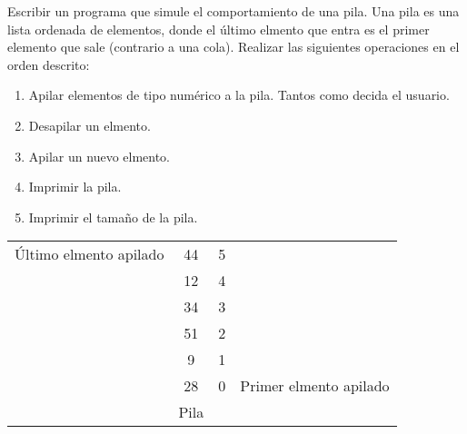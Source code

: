 
\question  Escribir un programa que simule el comportamiento de una pila.
           Una pila es una lista ordenada de elementos, donde el último
           elmento que entra es el primer elemento que sale (contrario a una
           cola). Realizar las siguientes operaciones en el orden descrito:

\begin{enumerate}
  \item Apilar elementos de tipo numérico a la pila. Tantos como decida el
        usuario.
  \item Desapilar un elmento.
  \item Apilar un nuevo elmento.
  \item Imprimir la pila.
  \item Imprimir el tamaño de la pila.
\end{enumerate}

\begin{center}
  \begin{tabular}{l|c|cr}
    Último elmento apilado  & 44 & 5 & \\
       & 12 & 4 & \\
       & 34 & 3 & \\
       & 51 & 2 & \\
       &  9 & 1 & \\
       & 28 & 0 & Primer elmento apilado\\
    \hline
       & Pila & &
  \end{tabular}
\end{center}
